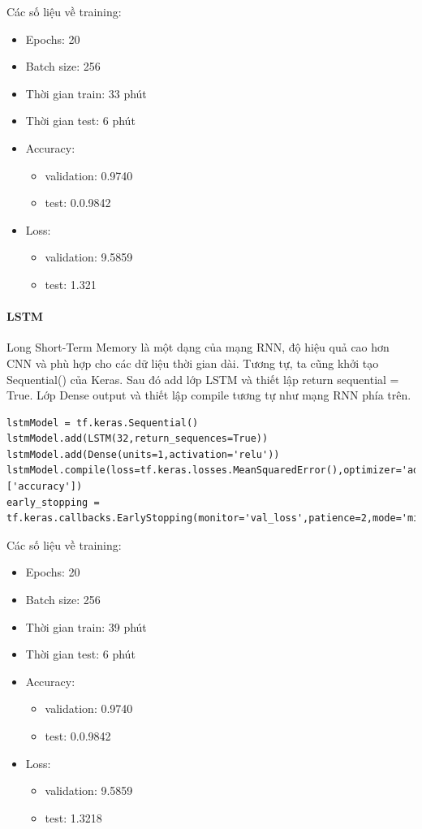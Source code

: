 \documentclass{article}
\begin{document}
Các số liệu về training:
\begin{itemize}
	\item Epochs: 20
	\item Batch size: 256
	\item Thời gian train: 33 phút
	\item Thời gian test: 6 phút
	\item Accuracy:
	\begin{itemize}
	    \item validation: 0.9740
	    \item test: 0.0.9842
	\end{itemize}
	\item Loss:
	\begin{itemize}
	    \item validation: 9.5859
	    \item test: 1.321
	\end{itemize}
\end{itemize}

\paragraph{LSTM} Long Short-Term Memory là một dạng của mạng RNN, độ hiệu quả cao hơn CNN và phù hợp cho các dữ liệu thời gian dài. Tương tự, ta cũng khởi tạo Sequential() của Keras. Sau đó add lớp LSTM và thiết lập return sequential = True. Lớp Dense output và thiết lập compile tương tự như mạng RNN phía trên.

\begin{verbatim}
lstmModel = tf.keras.Sequential()
lstmModel.add(LSTM(32,return_sequences=True))
lstmModel.add(Dense(units=1,activation='relu'))
lstmModel.compile(loss=tf.keras.losses.MeanSquaredError(),optimizer='adam',metrics=['accuracy'])
early_stopping = tf.keras.callbacks.EarlyStopping(monitor='val_loss',patience=2,mode='min')
\end{verbatim}

Các số liệu về training:
\begin{itemize}
	\item Epochs: 20
	\item Batch size: 256
	\item Thời gian train: 39 phút
	\item Thời gian test: 6 phút
	\item Accuracy:
	\begin{itemize}
	    \item validation: 0.9740
	    \item test: 0.0.9842
	\end{itemize}
	\item Loss:
	\begin{itemize}
	    \item validation: 9.5859
	    \item test: 1.3218
	\end{itemize}
\end{itemize}
\end{document}
